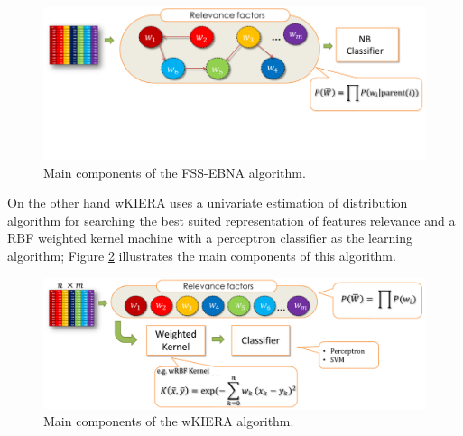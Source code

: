 \begin{figure}[ht]
	\centering
		\includegraphics[scale=1.3]{Images/FSSEBNA.png}
	\caption{Main components of the FSS-EBNA algorithm.}
	\label{fig:im06}
\end{figure}
 
On the other hand wKIERA uses a univariate estimation of distribution algorithm for searching the best suited representation of features relevance and a RBF weighted kernel machine with a perceptron classifier as the learning algorithm; Figure \ref{fig:im07} illustrates the main components of this algorithm.

\begin{figure}[ht]
	\centering
		\includegraphics[scale=1.3]{Images/wkiera.png}
	\caption{Main components of the wKIERA algorithm.}
	\label{fig:im07}
\end{figure}
